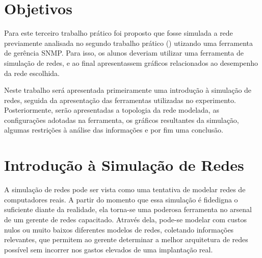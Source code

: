 \documentclass[brazil,times,12pt]{abnt}
\begin{document}





\data{\today}

\capa

\folhaderosto

\section*{Objetivos}
Para este terceiro trabalho prático foi proposto que fosse simulada a rede
previamente analisada no segundo trabalho prático (\cite{campos:pratica-gerencia-redes}) utizando uma
ferramenta de gerência SNMP. Para isso, os alunos deveriam utilizar uma
ferramenta de simulação de redes, e ao final apresentassem gráficos relacionados
ao desempenho da rede escolhida.

Neste trabalho será apresentada primeiramente uma introdução à simulação de
redes, seguida da apresentação das ferramentas utilizadas no experimento.
Posteriormente, serão apresentadas a topologia da rede modelada, as
configurações adotadas na ferramenta, os gráficos resultantes da simulação,
algumas restrições à análise das informações e por fim uma conclusão.

\section*{Introdução à Simulação de Redes}
A simulação de redes pode ser vista como uma tentativa de modelar redes de
computadores reais. A partir do momento que essa simulação é fidedigna o
suficiente diante da realidade, ela torna-se uma poderosa ferramenta no arsenal
de um gerente de redes capacitado. Através dela, pode-se modelar
com custos nulos ou muito baixos diferentes modelos de redes, coletando
informações relevantes, que permitem ao gerente determinar a melhor arquitetura
de redes possível sem incorrer nos gastos elevados de uma implantação real.
\cite{wiki:network-simulation}
\end{document}
